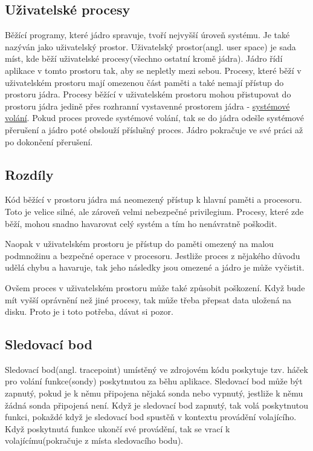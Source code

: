 \subsection{Uživatelské procesy}
Běžící programy, které jádro spravuje, tvoří nejvyšší úroveň systému. Je také nazýván jako uživatelský prostor.
Uživatelský prostor(angl. user space) je sada míst, kde běží uživatelské procesy(všechno ostatní kromě jádra). Jádro řídí aplikace v tomto
prostoru tak, aby se nepletly mezi sebou. Procesy, které běží v uživatelském prostoru mají omezenou část paměti a také nemají přístup do
prostoru jádra. Procesy běžící v uživatelském prostoru mohou přistupovat do prostoru jádra jedině přes rozhranní vystavenné prostorem
jádra - \hyperref[sec:systemoveVolani]{systémové volání}. Pokud proces provede systémové volání, tak se do jádra odešle systémové přerušení
a jádro poté obslouží příslušný proces. Jádro pokračuje ve své práci až po dokončení přerušení.

\subsection*{Rozdíly}
Kód běžící v prostoru jádra má neomezený přístup k hlavní paměti a procesoru. Toto je velice silné, ale zároveň velmi nebezpečné privilegium.
Procesy, které zde běží, mohou snadno havarovat celý systém a tím ho nenávratně poškodit.

Naopak v uživatelském prostoru je přístup do paměti omezený na malou podmnožinu a bezpečné operace v procesoru. Jestliže proces z nějakého
důvodu udělá chybu a havaruje, tak jeho následky jsou omezené a jádro je může vyčistit.

Ovšem proces v uživatelském prostoru může také způsobit poškození. Když bude mít vyšší oprávnění než jiné procesy, tak může třeba přepsat
data uložená na disku. Proto je i toto potřeba, dávat si pozor.

\subsection{Sledovací bod}
Sledovací bod(angl. tracepoint) umístěný ve zdrojovém kódu poskytuje tzv. háček pro volání funkce(sondy) poskytnutou za běhu aplikace.
Sledovací bod může být zapnutý, pokud je k němu připojena nějaká sonda nebo vypnutý, jestliže k němu žádná sonda připojená není. Když je
sledovací bod zapnutý, tak volá poskytnutou funkci, pokaždé když je sledovací bod spustěň v kontextu provádění volajícího. Když poskytnutá
funkce ukončí své provádění, tak se vrací k volajícímu(pokračuje z místa sledovacího bodu).

